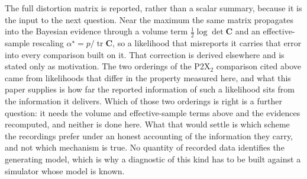 The full distortion matrix is reported, rather than a scalar summary, because it is the input to the next question. Near the maximum the same matrix propagates into the Bayesian evidence through a volume term $\tfrac12\log\det\mathbf{C}$ and an effective-sample rescaling $\alpha^\star=p/\operatorname{tr}\mathbf{C}$, so a likelihood that misreports it carries that error into every comparison built on it. That correction is derived elsewhere and is stated only as motivation.
The two orderings of the P2X$_2$ comparison cited above came from likelihoods that differ in the property measured here, and what this paper supplies is how far the reported information of such a likelihood sits from the information it delivers. Which of those two orderings is right is a further question: it needs the volume and effective-sample terms above and the evidences recomputed, and neither is done here. What that would settle is which scheme the recordings prefer under an honest accounting of the information they carry, and not which mechanism is true. No quantity of recorded data identifies the generating model, which is why a diagnostic of this kind has to be built against a simulator whose model is known.

